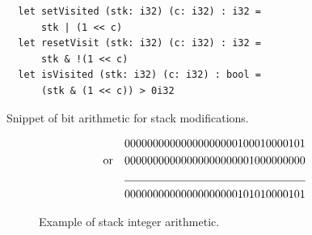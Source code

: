 \begin{listing}[H]
\begin{verbatim}
  let setVisited (stk: i32) (c: i32) : i32 =
      stk | (1 << c)
  let resetVisit (stk: i32) (c: i32) : i32 =
      stk & !(1 << c)
  let isVisited (stk: i32) (c: i32) : bool =
      (stk & (1 << c)) > 0i32
\end{verbatim}
\caption{Snippet of bit arithmetic for stack modifications.}
\label{lst:stack}
\end{listing}

\begin{figure}\label{fig:bits}
\begin{align*}
	&& &00000000000000000000100010000101 &\\ \text{or} 
	&& &00000000000000000000001000000000 &\\ 
	\cline{3-4}
	&& &00000000000000000000101010000101
\end{align*}
\caption{Example of stack integer arithmetic.}
\end{figure}















